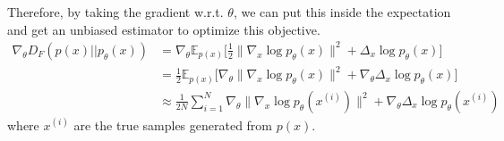 \documentclass{article}
\begin{document}
    Therefore, by taking the gradient w.r.t. $\theta$, we can put this inside the expectation and get an unbiased estimator to optimize this objective. 
    \begin{align}
      \nabla_\theta  D_F (p(x) || p_\theta (x)) & = \nabla_\theta \mathbb{E}_{p(x)} \bigg[ \frac{1}{2} \| \nabla_x \log p_\theta (x) \|^2 + \Delta_x \log p_\theta (x) \bigg] \\
                                                & = \frac{1}{2} \mathbb{E}_{p(x)} \bigg[ \nabla_\theta \| \nabla_x \log p_\theta (x) \|^2 + \nabla_\theta \Delta_x \log p_\theta (x) \bigg] \\ 
                                                & \approx \frac{1}{2N} \sum_{i=1}^N \nabla_\theta \| \nabla_x \log p_\theta (x^{(i)}) \|^2 + \nabla_\theta \Delta_x \log p_\theta (x^{(i)}) 
    \end{align}
    where $x^{(i)}$ are the true samples generated from $p(x)$. 
\end{document}
